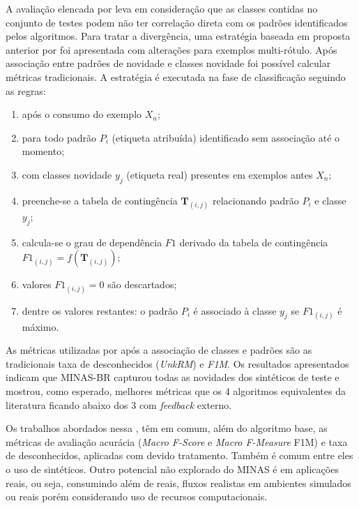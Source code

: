 
A avaliação elencada por  leva em consideração que as classes
contidas no conjunto de testes podem não ter correlação direta com os padrões identificados
pelos algoritmos.
Para tratar a divergência, uma estratégia baseada em proposta anterior por
 foi apresentada com alterações para exemplos multi-rótulo.
Após associação entre padrões de novidade e classes novidade foi possível calcular
métricas tradicionais.
A estratégia é executada na fase de classificação seguindo as regras:

\begin{enumerate}

    \item após o consumo do exemplo $X_n$;
    
    \item para todo padrão $P_i$ (etiqueta atribuída) identificado sem
    associação até o momento;
    
    \item com classes novidade $y_j$ (etiqueta real) presentes em exemplos antes
    $X_n$;
    
    \item preenche-se a tabela de contingência $\mathbf{T}_{(i,j)}$ relacionando
    padrão $P_i$ e classe $y_j$;
    
    \item calcula-se o grau de dependência $\mathit{F1}$ derivado da tabela de
    contingência $\mathit{F1}_{(i,j)} = f(\mathbf{T}_{(i,j)})$;
    
    \item valores $\mathit{F1}_{(i,j)} = 0$ são descartados;
    
    \item dentre os valores restantes: o padrão $P_i$ é associado à classe $y_j$
    se $\mathit{F1}_{(i,j)}$ é máximo.

\end{enumerate}

As métricas utilizadas por  após a associação de classes e
padrões são as tradicionais taxa de desconhecidos (\emph{UnkRM}) e \emph{F1M}.
Os resultados apresentados indicam que MINAS-BR capturou todas as novidades dos
\datasets sintéticos de teste e mostrou, como esperado, melhores métricas que os
4 algoritmos equivalentes da literatura ficando abaixo dos 3 com \emph{feedback}
externo.

Os trabalhos abordados nessa , têm em
comum, além do algoritmo base, as métricas de avaliação acurácia (\emph{Macro F-Score} e \emph{Macro
F-Measure} F1M) e taxa de desconhecidos, aplicadas com devido tratamento.
Também é comum entre eles o uso de \datasets sintéticos.
Outro potencial não explorado do MINAS é em aplicações reais, ou seja,
consumindo além de \datasets reais, fluxos realistas em ambientes simulados ou
reais porém considerando uso de recursos computacionais.

